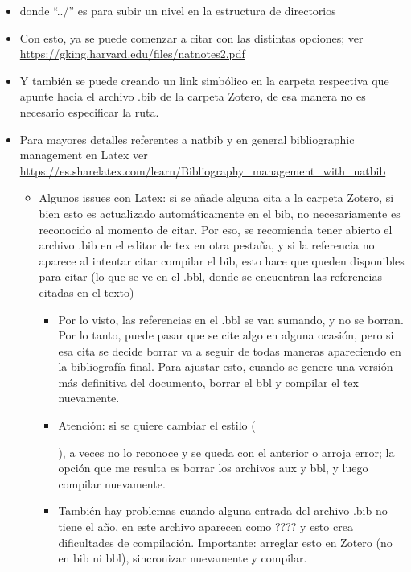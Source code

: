 \documentclass[11pt,]{book}
\providecommand{\tightlist}{%
  \setlength{\itemsep}{0pt}\setlength{\parskip}{0pt}}
\begin{document}
\begin{itemize}
\item
  donde ``../'' es para subir un nivel en la estructura de directorios
\item
  Con esto, ya se puede comenzar a citar con las distintas opciones; ver \url{https://gking.harvard.edu/files/natnotes2.pdf}
\item
  Y también se puede creando un link simbólico en la carpeta respectiva que apunte hacia el archivo .bib de la carpeta Zotero, de esa manera no es necesario especificar la ruta.
\item
  Para mayores detalles referentes a natbib y en general bibliographic management en Latex ver \url{https://es.sharelatex.com/learn/Bibliography_management_with_natbib}

  \begin{itemize}
  \tightlist
  \item
    Algunos issues con Latex: si se añade alguna cita a la carpeta Zotero, si bien esto es actualizado automáticamente en el bib, no necesariamente es reconocido al momento de citar. Por eso, se recomienda tener abierto el archivo .bib en el editor de tex en otra pestaña, y si la referencia no aparece al intentar citar compilar el bib, esto hace que queden disponibles para citar (lo que se ve en el .bbl, donde se encuentran las referencias citadas en el texto)

    \begin{itemize}
    \tightlist
    \item
      Por lo visto, las referencias en el .bbl se van sumando, y no se borran. Por lo tanto, puede pasar que se cite algo en alguna ocasión, pero si esa cita se decide borrar va a seguir de todas maneras apareciendo en la bibliografía final. Para ajustar esto, cuando se genere una versión más definitiva del documento, borrar el bbl y compilar el tex nuevamente.
    \item
      Atención: si se quiere cambiar el estilo (

      

      ), a veces no lo reconoce y se queda con el anterior o arroja error; la opción que me resulta es borrar los archivos aux y bbl, y luego compilar nuevamente.
    \item
      También hay problemas cuando alguna entrada del archivo .bib no tiene el año, en este archivo aparecen como ???? y esto crea dificultades de compilación. Importante: arreglar esto en Zotero (no en bib ni bbl), sincronizar nuevamente y compilar.
    \end{itemize}
  \end{itemize}
\end{itemize}
\end{document}
